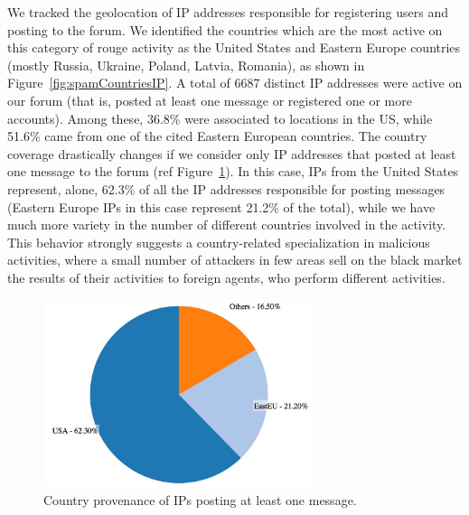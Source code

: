 We tracked the geolocation of IP addresses responsible for registering users and posting to the forum. We identified the countries which are the most active on this category of rouge activity as the United States and Eastern Europe countries (mostly Russia, Ukraine, Poland, Latvia, Romania), as shown in Figure~\ref{fig:spamCountriesIP}. A total of 6687 distinct IP addresses were active on our forum (that is, posted at least one message or registered one or more accounts). Among these, 36.8\% were associated to locations in the US, while 51.6\% came from one of the cited Eastern European countries. The country coverage drastically changes if we consider only IP addresses that posted at least one message to the forum (ref Figure~\ref{fig:spamCountriesMessage}). In this case, IPs from the United States represent, alone, 62.3\% of all the IP addresses responsible for posting messages (Eastern Europe IPs in this case represent 21.2\% of the total), while we have much more variety in the number of different countries involved in the activity. This behavior strongly suggests a country-related specialization in malicious activities, where a small number of attackers in few areas sell on the black market the results of their activities to foreign agents, who perform different activities.

\begin{figure}[tbh]
\centerline{\includegraphics[width=0.7\textwidth]{Images/spamCountriesMessage.jpg}}
\caption{Country provenance of IPs posting at least one message.\label{fig:spamCountriesMessage}}
\end{figure}


